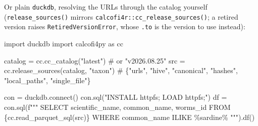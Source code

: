 \documentclass[
  letterpaper,
  DIV=11,
  numbers=noendperiod]{scrreprt}
\newenvironment{Shaded}{\begin{snugshade}}{\end{snugshade}}
\newcommand{\CommentTok}[1]{\textcolor[rgb]{0.37,0.37,0.37}{#1}}
\newcommand{\ExtensionTok}[1]{\textcolor[rgb]{0.00,0.23,0.31}{#1}}
\newcommand{\FunctionTok}[1]{\textcolor[rgb]{0.28,0.35,0.67}{#1}}
\newcommand{\ImportTok}[1]{\textcolor[rgb]{0.00,0.46,0.62}{#1}}
\newcommand{\KeywordTok}[1]{\textcolor[rgb]{0.00,0.23,0.31}{\textbf{#1}}}
\newcommand{\NormalTok}[1]{\textcolor[rgb]{0.00,0.23,0.31}{#1}}
\newcommand{\OperatorTok}[1]{\textcolor[rgb]{0.37,0.37,0.37}{#1}}
\newcommand{\SpecialCharTok}[1]{\textcolor[rgb]{0.37,0.37,0.37}{#1}}
\newcommand{\SpecialStringTok}[1]{\textcolor[rgb]{0.13,0.47,0.30}{#1}}
\newcommand{\StringTok}[1]{\textcolor[rgb]{0.13,0.47,0.30}{#1}}
\begin{document}
\begin{tcolorbox}
\begin{Shaded}
\end{Shaded}

\end{tcolorbox}

Or plain \texttt{duckdb}, resolving the URLs through the catalog
yourself (\texttt{release\_sources()} mirrors
\texttt{calcofi4r::cc\_release\_sources()}; a retired version raises
\texttt{RetiredVersionError}, whose \texttt{.to} is the version to use
instead):

\begin{Shaded}
\begin{Highlighting}[]
\ImportTok{import}\NormalTok{ duckdb}
\ImportTok{import}\NormalTok{ calcofi4py }\ImportTok{as}\NormalTok{ cc}

\NormalTok{catalog }\OperatorTok{=}\NormalTok{ cc.cc\_catalog(}\StringTok{"latest"}\NormalTok{)                 }\CommentTok{\# or "v2026.08.25"}
\NormalTok{src     }\OperatorTok{=}\NormalTok{ cc.release\_sources(catalog, }\StringTok{"taxon"}\NormalTok{)    }\CommentTok{\# \{"urls", "hive", "canonical", "hashes", "local\_paths", "single\_file"\}}

\NormalTok{con }\OperatorTok{=}\NormalTok{ duckdb.}\ExtensionTok{connect}\NormalTok{()}
\NormalTok{con.sql(}\StringTok{"INSTALL httpfs; LOAD httpfs;"}\NormalTok{)}
\NormalTok{df }\OperatorTok{=}\NormalTok{ con.sql(}\SpecialStringTok{f"""}
\SpecialStringTok{  SELECT scientific\_name, common\_name, worms\_id}
\SpecialStringTok{  FROM }\SpecialCharTok{\{}\NormalTok{cc}\SpecialCharTok{.}\NormalTok{read\_parquet\_sql(src)}\SpecialCharTok{\}}
\SpecialStringTok{  WHERE common\_name ILIKE \textquotesingle{}\%sardine\%\textquotesingle{}}
\SpecialStringTok{"""}\NormalTok{).df()}
\end{Highlighting}
\end{Shaded}
\end{document}
